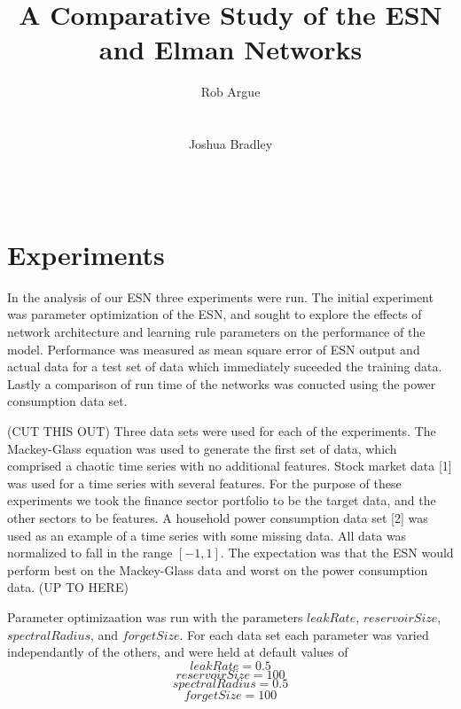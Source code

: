 \documentclass{acm_proc_article-sp}
\begin{document}
\title{A Comparative Study of the ESN and Elman Networks}

\author{
\alignauthor
Rob Argue\\
       \\
       \\
\alignauthor
Joshua Bradley\\
       \\
       \\
}
\maketitle

\section{Experiments}
In the analysis of our ESN three experiments were run. The initial experiment was parameter optimization of the ESN, and sought to explore the effects of network architecture and learning rule parameters on the performance of the model. Performance was measured as mean square error of ESN output and actual data for a test set of data which immediately suceeded the training data. Lastly a comparison of run time of the networks was conucted using the power consumption data set.

(CUT THIS OUT)
Three data sets were used for each of the experiments. The Mackey-Glass equation was used to generate the first set of data, which comprised a chaotic time series with no additional features. Stock market data [1] was used for a time series with several features. For the purpose of these experiments we took the finance sector portfolio to be the target data, and the other sectors to be features. A household power consumption data set [2] was used as an example of a time series with some missing data. All data was normalized to fall in the range $[-1,1]$. The expectation was that the ESN would perform best on the Mackey-Glass data and worst on the power consumption data.
(UP TO HERE)

Parameter optimizaation was run with the parameters $leakRate$, $reservoirSize$, $spectralRadius$, and $forgetSize$. For each data set each parameter was varied independantly of the others, and were held at default values of
$$leakRate = 0.5$$
$$reservoirSize = 100$$
$$spectralRadius = 0.5$$
$$forgetSize = 100$$
\end{document}
